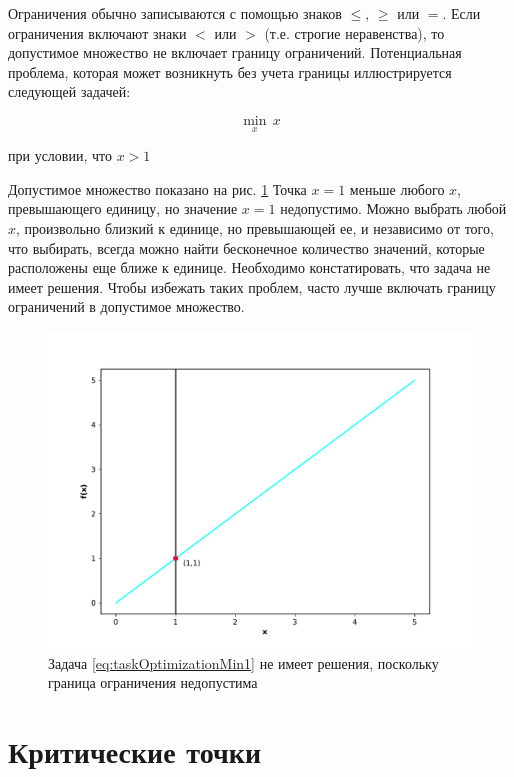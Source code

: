 Ограничения обычно записываются с помощью знаков $\leq$, $\geq$ или $=$. Если ограничения включают знаки $<$ или $>$ (т.е. строгие неравенства), то допустимое множество не включает границу ограничений. Потенциальная проблема, которая может возникнуть без учета границы иллюстрируется следующей задачей:


\begin{equation}
  \min_{x} \, x 
  \label{eq:taskOptimizationMin1}
\end{equation}

 \begin{center}
 при условии, что $x>1$
 \end{center}

 Допустимое множество показано на рис. \ref{fig:figure_3} Точка $x = 1$ меньше любого $x$, превышающего единицу, но значение $x = 1$ недопустимо. Можно выбрать любой $x$, произвольно близкий к единице, но превышающей ее, и независимо от того, что выбирать, всегда можно найти бесконечное количество значений, которые расположены еще ближе к единице. Необходимо констатировать, что задача не имеет решения. Чтобы избежать таких проблем, часто лучше включать границу ограничений в допустимое множество.


\begin{figure}[ht]
 \centering
		\includegraphics[height = 8 cm, keepaspectratio]{../assets/images/Figure_3.pdf}
		\caption{ Задача \eqref{eq:taskOptimizationMin1} не имеет решения, поскольку граница ограничения недопустима }
		\label{fig:figure_3}
	\end{figure}
    
\section{Критические точки}

